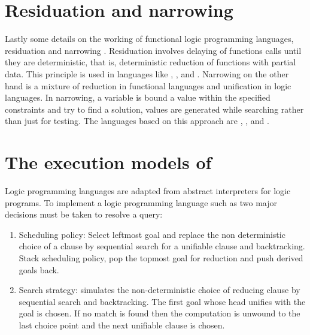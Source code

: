 \documentclass[proposal.tex]{subfiles}
\begin{document}
\section{Residuation and narrowing}
Lastly some details on the working of functional logic programming languages, residuation and narrowing
\cite{hanus1995curry,webiste:wikicurry}.
Residuation involves delaying of functions calls until they are deterministic, that is, deterministic reduction of
functions with partial data.
This principle is used in languages like  \cite{lloyd1999programming:escher}, 
\cite{website:life},  \cite{website:nue-prolog} and  \cite{website:oz-mozart}.
Narrowing on the other hand is a mixture of reduction in functional languages and unification in logic languages.
In narrowing, a variable is bound a value within the specified constraints and try to find a solution, values are
generated while searching rather than just for testing.
The languages based on this approach are  \cite{website:alf},  \cite{website:babel},
 \cite{bert1987lpg} and  \cite{website:curry}.

\section[{The execution models of \progLang{Prolog}}]{The execution models of  \cite{Sterling:1994:APA:175753}
}\label{sec:exec-models-prolog}
Logic programming languages are adapted from abstract interpreters for logic programs. 
To implement a logic programming language such as  two major decisions must be taken to resolve a query:
\begin{enumerate}
\item Scheduling policy:
Select leftmost goal and replace the non deterministic choice of a clause by sequential search for a unifiable clause and backtracking. 
Stack scheduling policy, pop the topmost goal for reduction and push derived goals back.

\item Search strategy:
 simulates the non-deterministic choice of reducing clause by sequential search and backtracking. The first goal whose 
head unifies with the goal is chosen. If no match is found then the computation is unwound to the last choice point and the next unifiable 
clause is chosen.
\end{enumerate}
\end{document}

